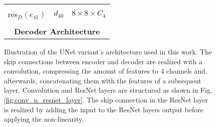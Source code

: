 \begin{figure}[h!]
\begin{minipage}{0.55\textwidth}
\begin{tabular}{l|c|l}
			\hline
			&&\\
			res$_D(e_{41})$ & $d_{40}$ & $8 \times 8 \times C_4$\\
			\multicolumn{3}{c}{}             \\
			\multicolumn{3}{c}{\textbf{Decoder Architecture}} \\
		\end{tabular}
	\end{minipage}
\caption{\label{fig:std_unet}Illustration of the UNet variant's architecture used in this work. The skip connections between encoder and decoder are realized with a convolution, compressing the amount of features to 4 channels and, afterwards, concatenating them with the features of a subsequent layer. Convolution and ResNet layers are structured as shown in Fig. \ref{fig:conv_n_resnet_layer}. The skip connection in the ResNet layer is realized by adding the input to the ResNet layers output before applying the non-linearity.}
\end{figure}
%
